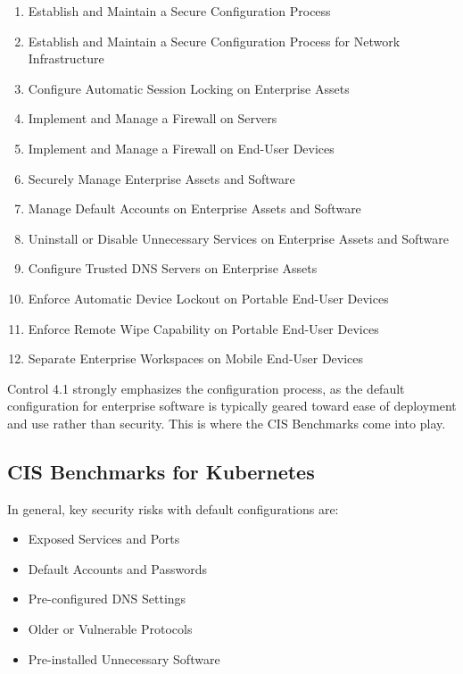 \begin{enumerate}
    \item Establish and Maintain a Secure Configuration Process
    \item Establish and Maintain a Secure Configuration Process for
Network Infrastructure
    \item Configure Automatic Session Locking on Enterprise Assets
    \item Implement and Manage a Firewall on Servers
    \item Implement and Manage a Firewall on End-User Devices
    \item Securely Manage Enterprise Assets and Software
    \item Manage Default Accounts on Enterprise Assets and Software
    \item Uninstall or Disable Unnecessary Services on Enterprise Assets
and Software
    \item Configure Trusted DNS Servers on Enterprise Assets
    \item Enforce Automatic Device Lockout on Portable End-User Devices
    \item Enforce Remote Wipe Capability on Portable End-User Devices
    \item Separate Enterprise Workspaces on Mobile End-User Devices
\end{enumerate}

Control 4.1 strongly emphasizes the configuration process, as the default configuration for enterprise software is typically geared toward ease of deployment and use rather than security. This is where the CIS Benchmarks come into play.

\subsection{CIS Benchmarks for Kubernetes}

In general, key security risks with default configurations are:

\begin{itemize}
    \item Exposed Services and Ports
    \item Default Accounts and Passwords
    \item Pre-configured DNS Settings
    \item Older or Vulnerable Protocols
    \item Pre-installed Unnecessary Software
\end{itemize}

